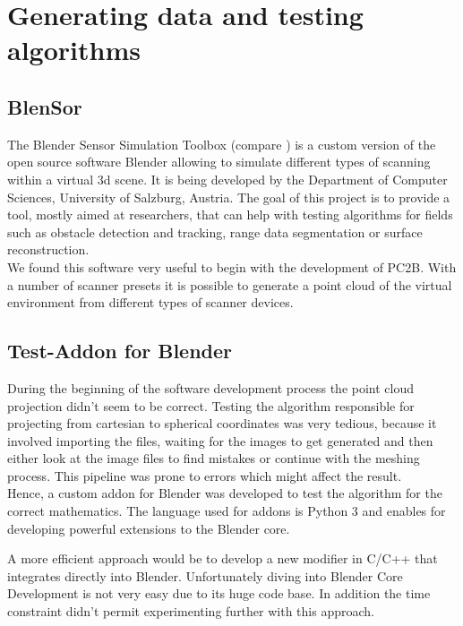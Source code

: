 \section{Generating data and testing algorithms}

\subsection{BlenSor}

The Blender Sensor Simulation Toolbox (compare \parencite{Gschwandtner11b}) is a custom version of the open source software Blender allowing to simulate different types of scanning within a virtual 3d scene. It is being developed by the Department of Computer Sciences, University of Salzburg, Austria. The goal of this project is to provide a tool, mostly aimed at researchers, that can help with testing algorithms for fields such as obstacle detection and tracking, range data segmentation or surface reconstruction.\\
We found this software very useful to begin with the development of PC2B. With a number of scanner presets it is possible to generate a point cloud of the virtual environment from different types of scanner devices.

\subsection{Test-Addon for Blender}

During the beginning of the software development process the point cloud projection didn't seem to be correct. Testing the algorithm responsible for projecting from cartesian to spherical coordinates was very tedious, because it involved importing the files, waiting for the images to get generated and then either look at the image files to find mistakes or continue with the meshing process. This pipeline was prone to errors which might affect the result.\\
Hence, a custom addon for Blender was developed to test the algorithm for the correct mathematics. The language used for addons is Python 3 and enables for developing powerful extensions to the Blender core.

A more efficient approach would be to develop a new modifier in C/C++ that integrates directly into Blender. Unfortunately diving into Blender Core Development is not very easy due to its huge code base. In addition the time constraint didn't permit experimenting further with this approach.


